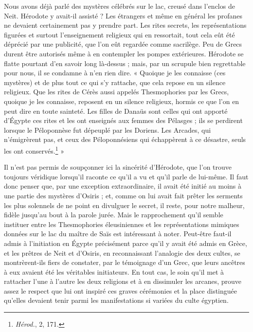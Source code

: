 \documentclass[letterpaper,twocolumn,openany,nodeprecatedcode]{dndbook}
\begin{document}
Nous avons déjà parlé des mystères célébrés sur le lac, creusé dans l'enclos de Neit. Hérodote y avait-il assisté ? Les étrangers et même en général les profanes ne devaient certainement pas y prendre part. Les rites secrets, les représentations figurées et surtout l'enseignement religieux qui en ressortait, tout cela eût été déprécié par une publicité, que l'on eût regardée comme sacrilège. Peu de Grecs durent être autorisés même à en contempler les pompes extérieures. Hérodote se flatte pourtant d'en savoir long là-dessus ; mais, par un scrupule bien regrettable pour nous, il se condamne à n'en rien dire. « Quoique je les connaisse (ces mystères) et de plus tout ce qui s'y rattache, que cela repose en un silence religieux. Que les rites de Cérès aussi appelés Thesmophories par les Grecs, quoique je les connaisse, reposent en un silence religieux, hormis ce que l'on en peut dire en toute sainteté. Les filles de Danaüs sont celles qui ont apporté d'Égypte ces rites et les ont enseignés aux femmes des Pélasges ; ils se perdirent lorsque le Péloponnèse fut dépeuplé par les Doriens. Les Arcades, qui n'émigrèrent pas, et ceux des Péloponnésiens qui échappèrent à ce désastre, seuls les ont conservés.\footnote{\emph{Hérod.}, 2, 171.} »

Il n'est pas permis de soupçonner ici la sincérité d'Hérodote, que l'on trouve toujours véridique lorsqu'il raconte ce qu'il a vu et qu'il parle de lui-même. Il faut donc penser que, par une exception extraordinaire, il avait été initié au moins à une partie des mystères d'Osiris ; et, comme on lui avait fait prêter les serments les plus solennels de ne point en divulguer le secret, il reste, pour notre malheur, fidèle jusqu'au bout à la parole jurée. Mais le rapprochement qu'il semble instituer entre les Thesmophories éleusiniennes et les représentations mimiques données sur le lac du maître de Saïs est intéressant à noter. Peut-être faut-il admis à l'initiation en Égypte précisément parce qu’il y avait été admis en Grèce, et les prêtres de Neit et d'Osiris, en reconnaissant l'analogie des deux cultes, se montrèrent-ils fiers de constater, par le témoignage d'un Grec, que leurs ancêtres à eux avaient été les véritables initiateurs. En tout cas, le soin qu'il met à rattacher l'une à l'autre les deux religions et à en dissimuler les arcanes, prouve assez le respect que lui ont inspiré ces graves cérémonies et la place distinguée qu'elles devaient tenir parmi les manifestations si variées du culte égyptien.
\end{document}
